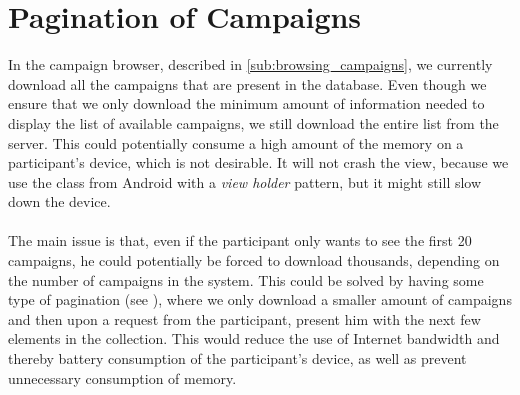 
\section{Pagination of Campaigns}
\label{sec:pagination_of_campaigns}

In the campaign browser, described in \ref{sub:browsing_campaigns}, we currently download all the campaigns that are present in the database. Even though we ensure that we only download the minimum amount of information needed to display the list of available campaigns, we still download the entire list from the server. This could potentially consume a high amount of the memory on a participant's device, which is not desirable. It will not crash the view, because we use the  class from Android with a \emph{view holder} pattern, but it might still slow down the device.
\\\\
The main issue is that, even if the participant only wants to see the first 20 campaigns, he could potentially be forced to download thousands, depending on the number of campaigns in the system. This could be solved by having some type of pagination (see ), where we only download a smaller amount of campaigns and then upon a request from the participant, present him with the next few elements in the collection. This would reduce the use of Internet bandwidth and thereby battery consumption of the participant's device, as well as prevent unnecessary consumption of memory.